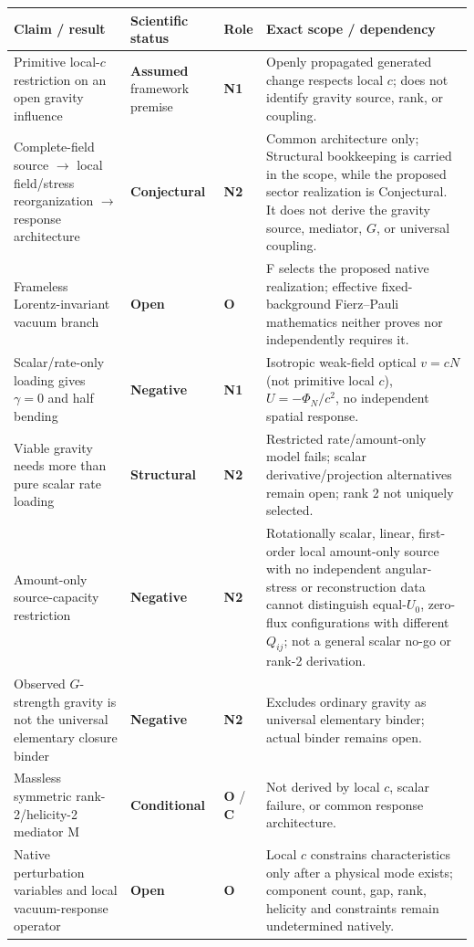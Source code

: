 \documentclass[11pt]{article}
\newcommand{\statusNegative}{\textcolor{red!65!black}{\textbf{Negative}}}
\newcommand{\statusStructural}{\textcolor{blue!55!black}{\textbf{Structural}}}
\newcommand{\statusConditional}{\textcolor{yellow!60!black}{\textbf{Conditional}}}
\newcommand{\statusAssumed}{\textcolor{orange!80!black}{\textbf{Assumed}}}
\newcommand{\statusOpen}{\textcolor{red!75!black}{\textbf{Open}}}
\newcommand{\statusConjectural}{\textcolor{magenta!65!black}{\textbf{Conjectural}}}
\newcommand{\NOne}{\textbf{N1}}
\newcommand{\NTwo}{\textbf{N2}}
\newcommand{\Control}{\textbf{C}}
\newcommand{\OpenBridge}{\textbf{O}}
\theoremstyle{plain}
\theoremstyle{remark}
\begin{document}
{\footnotesize
\setlength{\tabcolsep}{3pt}
\begin{longtable}{@{}P{3.8cm}P{2.8cm}P{1.5cm}P{5.3cm}@{}}
\toprule
\textbf{Claim / result} & \textbf{Scientific status} & \textbf{Role} & \textbf{Exact scope / dependency} \\
\midrule
\endhead
Primitive local-$c$ restriction on an open gravity influence & \statusAssumed{} framework premise & \NOne{} & Openly propagated generated change respects local $c$; does not identify gravity source, rank, or coupling. \\
Complete-field source $\to$ local field/stress reorganization $\to$ response architecture & \statusConjectural{} & \NTwo{} & Common architecture only; Structural bookkeeping is carried in the scope, while the proposed sector realization is Conjectural. It does not derive the gravity source, mediator, $G$, or universal coupling. \\
Frameless Lorentz-invariant vacuum branch & \statusOpen{} & \OpenBridge{} & F selects the proposed native realization; effective fixed-background Fierz--Pauli mathematics neither proves nor independently requires it. \\
Scalar/rate-only loading gives $\gamma=0$ and half bending & \statusNegative{} & \NOne{} & Isotropic weak-field optical $v=cN$ (not primitive local $c$), $U=-\Phi_N/c^2$, no independent spatial response. \\
Viable gravity needs more than pure scalar rate loading & \statusStructural{} & \NTwo{} & Restricted rate/amount-only model fails; scalar derivative/projection alternatives remain open; rank 2 not uniquely selected. \\
Amount-only source-capacity restriction & \statusNegative{} & \NTwo{} & Rotationally scalar, linear, first-order local amount-only source with no independent angular-stress or reconstruction data cannot distinguish equal-$U_0$, zero-flux configurations with different $Q_{ij}$; not a general scalar no-go or rank-2 derivation. \\
Observed $G$-strength gravity is not the universal elementary closure binder & \statusNegative{} & \NTwo{} & Excludes ordinary gravity as universal elementary binder; actual binder remains open. \\
Massless symmetric rank-2/helicity-2 mediator M & \statusConditional{} & \OpenBridge{} / \Control{} & Not derived by local $c$, scalar failure, or common response architecture. \\
Native perturbation variables and local vacuum-response operator & \statusOpen{} & \OpenBridge{} & Local $c$ constrains characteristics only after a physical mode exists; component count, gap, rank, helicity and constraints remain undetermined natively. \\

\end{longtable}}
\end{document}
